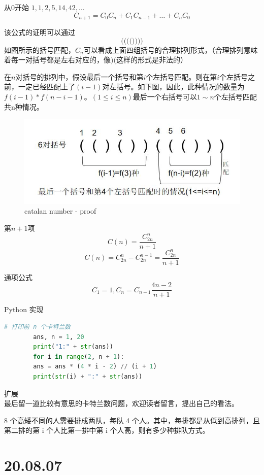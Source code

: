\documentclass[10pt,a4paper]{book}
\begin{document}
	从0开始 $ 1, 1, 2, 5, 14, 42, \dots $
	\[
	C_{n+1} = C_0 C_n + C_1 C_{n-1} + \dots + C_n C_0
	\]
	
	该公式的证明可以通过
	\[
	\Bigg( \bigg( \Big( \big( \Bigg) \bigg) \Big) \big)
	\]
	如图所示的括号匹配，$ C_n $可以看成上面四组括号的合理排列形式，（合理排列意味着每一对括号都是左右对应的，像$ )( $这样的形式是非法的）
	
	在$ n $对括号的排列中，假设最后一个括号和第$ i $个左括号匹配。则在第$ i $个左括号之前，一定已经匹配上了$ (i-1) $对左括号。如下图，因此，此种情况的数量为$ f(i-1)*f(n-i-1) $。$ (1\leq i\leq n) $最后一个右括号可以$ 1 \sim n $个左括号匹配共n种情况。
	
	\begin{figure} [h]
		\centering
		\includegraphics[width=0.7\linewidth]{pic/catalan_proof-001}
		\caption{catalan number - proof}
		\label{fig:catalanproof-001}
	\end{figure}
	
	
	第$ n+1 $项 
	\[C(n) = \frac{C^n_{2n}}{n+1} \]
	\[	C(n) = C_{2n}^n-C_{2n}^{n-1} = \frac{C_{2n}^n}{n+1}	\]
	
	通项公式
	\[ C_1 = 1, C_n = C_{n-1}\frac{4n-2}{n+1} \]
	
	
	Python 实现
	
	
	\begin{lstlisting}[language=Python]
		# 打印前 n 个卡特兰数
		ans, n = 1, 20
		print("1:" + str(ans))
		for i in range(2, n + 1):
		ans = ans * (4 * i - 2) // (i + 1)
		print(str(i) + ":" + str(ans))
	\end{lstlisting}
	
	
	扩展\\
	
	最后留一道比较有意思的卡特兰数问题，欢迎读者留言，提出自己的看法。
	
	8 个高矮不同的人需要排成两队，每队 4 个人。其中，每排都是从低到高排列，且第二排的第 i 个人比第一排中第 i 个人高，则有多少种排队方式。
	
	
	
	\section{20.08.07}
	
\end{document}
